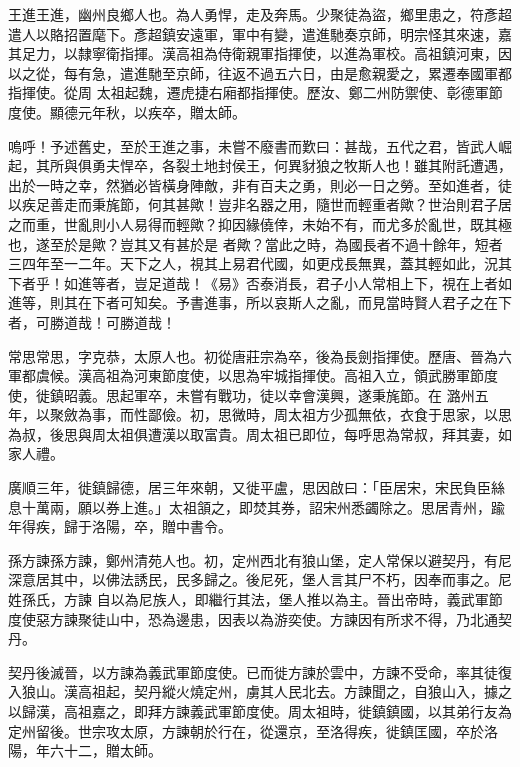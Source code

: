 \begin{pinyinscope}
 王進王進，幽州良鄉人也。為人勇悍，走及奔馬。少聚徒為盜，鄉里患之，符彥超遣人以賂招置麾下。彥超鎮安遠軍，軍中有變，遣進馳奏京師，明宗怪其來速，嘉其足力，以隸寧衛指揮。漢高祖為侍衛親軍指揮使，以進為軍校。高祖鎮河東，因以之從，每有急，遣進馳至京師，往返不過五六日，由是愈親愛之，累遷奉國軍都指揮使。從周
 太祖起魏，遷虎捷右廂都指揮使。歷汝、鄭二州防禦使、彰德軍節度使。顯德元年秋，以疾卒，贈太師。



 嗚呼！予述舊史，至於王進之事，未嘗不廢書而歎曰：甚哉，五代之君，皆武人崛起，其所與俱勇夫悍卒，各裂土地封侯王，何異豺狼之牧斯人也！雖其附託遭遇，出於一時之幸，然猶必皆橫身陣敵，非有百夫之勇，則必一日之勞。至如進者，徒以疾足善走而秉旄節，何其甚歟！豈非名器之用，隨世而輕重者歟？世治則君子居之而重，世亂則小人易得而輕歟？抑因緣僥倖，未始不有，而尤多於亂世，既其極也，遂至於是歟？豈其又有甚於是
 者歟？當此之時，為國長者不過十餘年，短者三四年至一二年。天下之人，視其上易君代國，如更戍長無異，蓋其輕如此，況其下者乎！如進等者，豈足道哉！《易》否泰消長，君子小人常相上下，視在上者如進等，則其在下者可知矣。予書進事，所以哀斯人之亂，而見當時賢人君子之在下者，可勝道哉！可勝道哉！



 常思常思，字克恭，太原人也。初從唐莊宗為卒，後為長劍指揮使。歷唐、晉為六軍都虞候。漢高祖為河東節度使，以思為牢城指揮使。高祖入立，領武勝軍節度使，徙鎮昭義。思起軍卒，未嘗有戰功，徒以幸會漢興，遂秉旄節。在
 潞州五年，以聚斂為事，而性鄙儉。初，思微時，周太祖方少孤無依，衣食于思家，以思為叔，後思與周太祖俱遭漢以取富貴。周太祖已即位，每呼思為常叔，拜其妻，如家人禮。



 廣順三年，徙鎮歸德，居三年來朝，又徙平盧，思因啟曰：「臣居宋，宋民負臣絲息十萬兩，願以券上進。」太祖頷之，即焚其券，詔宋州悉蠲除之。思居青州，踰年得疾，歸于洛陽，卒，贈中書令。



 孫方諫孫方諫，鄭州清苑人也。初，定州西北有狼山堡，定人常保以避契丹，有尼深意居其中，以佛法誘民，民多歸之。後尼死，堡人言其尸不朽，因奉而事之。尼姓孫氏，方諫
 自以為尼族人，即繼行其法，堡人推以為主。晉出帝時，義武軍節度使惡方諫聚徒山中，恐為邊患，因表以為游奕使。方諫因有所求不得，乃北通契丹。



 契丹後滅晉，以方諫為義武軍節度使。已而徙方諫於雲中，方諫不受命，率其徒復入狼山。漢高祖起，契丹縱火燒定州，虜其人民北去。方諫聞之，自狼山入，據之以歸漢，高祖嘉之，即拜方諫義武軍節度使。周太祖時，徙鎮鎮國，以其弟行友為定州留後。世宗攻太原，方諫朝於行在，從還京，至洛得疾，徙鎮匡國，卒於洛陽，年六十二，贈太師。



\end{pinyinscope}